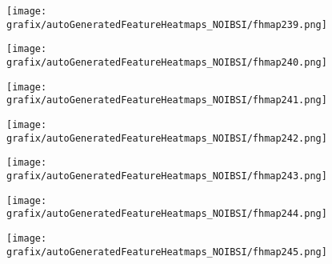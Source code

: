 \hspace{\hsp} 
\begin{subfigure}{\wid\textwidth} 
    \centering 
    \caption{\tiny \sffamily {}} 
    \vspace{\vsp} 
    \texttt{[image: grafix/autoGeneratedFeatureHeatmaps\_NOIBSI/fhmap239.png]} 
\end{subfigure} 
\hspace{\hsp} 
\begin{subfigure}{\wid\textwidth} 
    \centering 
    \caption{\tiny \sffamily {}} 
    \vspace{\vsp} 
    \texttt{[image: grafix/autoGeneratedFeatureHeatmaps\_NOIBSI/fhmap240.png]} 
\end{subfigure} 
\hspace{\hsp} 
\begin{subfigure}{\wid\textwidth} 
    \centering 
    \caption{\tiny \sffamily {}} 
    \vspace{\vsp} 
    \texttt{[image: grafix/autoGeneratedFeatureHeatmaps\_NOIBSI/fhmap241.png]} 
\end{subfigure} 
\hspace{\hsp} 
\begin{subfigure}{\wid\textwidth} 
    \centering 
    \caption{\tiny \sffamily {}} 
    \vspace{\vsp} 
    \texttt{[image: grafix/autoGeneratedFeatureHeatmaps\_NOIBSI/fhmap242.png]} 
\end{subfigure} 
\hspace{\hsp} 
\begin{subfigure}{\wid\textwidth} 
    \centering 
    \caption{\tiny \sffamily {}} 
    \vspace{\vsp} 
    \texttt{[image: grafix/autoGeneratedFeatureHeatmaps\_NOIBSI/fhmap243.png]} 
\end{subfigure} 
\hspace{\hsp} 
\begin{subfigure}{\wid\textwidth} 
    \centering 
    \caption{\tiny \sffamily {}} 
    \vspace{\vsp} 
    \texttt{[image: grafix/autoGeneratedFeatureHeatmaps\_NOIBSI/fhmap244.png]} 
\end{subfigure} 
\hspace{\hsp} 
\begin{subfigure}{\wid\textwidth} 
    \centering 
    \caption{\tiny \sffamily {}} 
    \vspace{\vsp} 
    \texttt{[image: grafix/autoGeneratedFeatureHeatmaps\_NOIBSI/fhmap245.png]} 
\end{subfigure} 
